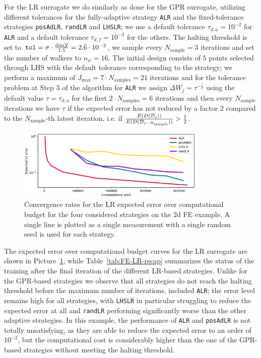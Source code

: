 For the LR surrogate we do similarly as done for the GPR surrogate, utilizing different tolerances for the fully-adaptive strategy \texttt{ALR} and the fixed-tolerance strategies \texttt{posAdLR}, \texttt{randLR} and \texttt{LHSLR}; we use a default tolerance $\tau_{d,a}= 10^{-2}$ for \texttt{ALR} and a default tolerance $\tau_{d,f} = 10^{-3}$ for the others.
The halting threshold is set to $\texttt{tol} = \sigma \cdot \frac{\text{dim} \mathcal Y }{1.5} = 2.\bar 6 \cdot 10^{-2}$, we sample every $N_{\text{sample}} = 3$ iterations and set the number of walkers to $n_w = 16$.
The initial design consists of $5$ points selected through LHS with the default tolerance corresponding to the strategy; we perform a maximum of $J_{\max} = 7 \cdot N_{\text{samples}} = 21 $ iterations and for the tolerance problem at Step 3 of the algorithm for \texttt{ALR} we assign $\Delta W_j = \tau ^{-\frac{l}{r}}$ using the default value $\tau= \tau_{d,a}$ for the first $2\cdot N_{\text{samples}} = 6$ iterations and then every $N_{\text{sample}}$ iterations we have $\tau$ if the expected error has not reduced by a factor 2 compared to the $N_{\text{sample}}$-th latest iteration, i.e. if $\frac{E(D(\mathcal D_j))}{E(D(\mathcal D_{j-N_{\text{sample}}}))} > \frac{1}{2}$.\medskip

\begin{figure}[H]
    \begin{center}
        \includegraphics[width=0.8\textwidth]{results/pictures/d2/LR_res.png}
    \end{center}
    \caption{Convergence rates for the LR expected error over computational budget for the four considered strategies on the 2d FE example. A single line is plotted as a single measurement with a single random seed is used for each strategy.}
        \label{fig:FE-LR-convergence}
\end{figure}

The expected error over computational budget curves for the LR surrogate are shown in Picture~\ref{fig:FE-LR-convergence}, while Table~\ref{tab:FE-LR-recap} summarizes the status of the training after the final iteration of the different LR-based strategies. 
Unlike for the GPR-based strategies we observe that all strategies do not reach the halting threshold before the maximum number of iterations, included \texttt{ALR}; the error level remains high for all strategies, with \texttt{LHSLR} in particular struggling to reduce the expected error at all and \texttt{randLR} performing significantly worse than the other adaptive strategies.
In this example, the performance of \texttt{ALR} and \texttt{posAdLR} is not totally unsatisfying, as they are able to reduce the expected error to an order of $10^{-2}$, but the computational cost is considerably higher than the one of the GPR-based strategies without meeting the halting threshold.

